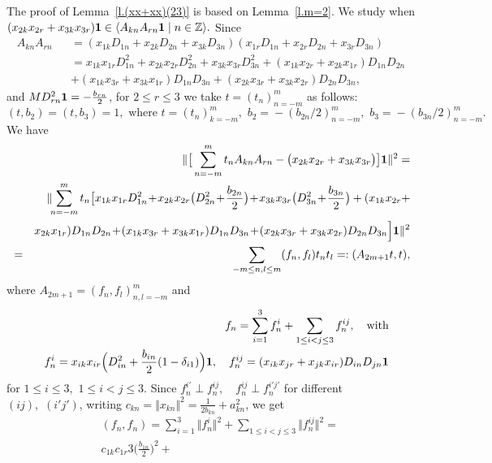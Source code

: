 \documentclass[preprint,12pt]{elsarticle}
\numberwithin{equation}{section}
\begin{document}
\begin{pf}The proof of  Lemma~\ref{l.(xx+xx)(23)}  is based on Lemma~\ref{l.m=2}. 
We study when
$
(x_{2k}x_{2r}+x_{3k}x_{3r}){\bf 1}
\in\langle A_{kn}A_{rn}{\bf 1}\mid n\in{\mathbb
Z}\rangle.
$
Since
\begin{eqnarray*}
A_{kn}A_{rn}&&=(x_{1k}D_{1n}+x_{2k}D_{2n}+x_{3k}D_{3n})(x_{1r}D_{1n}+x_{2r}D_{2n}+x_{3r}D_{3n})\\
&&=x_{1k}x_{1r}D_{1n}^2+
x_{2k}x_{2r}D_{2n}^2+
x_{3k}x_{3r}D_{3n}^2+
(x_{1k}x_{2r}+x_{2k}x_{1r})D_{1n}D_{2n}\\
&&
+(x_{1k}x_{3r}+x_{3k}x_{1r})D_{1n}D_{3n}+
(x_{2k}x_{3r}+x_{3k}x_{2r})D_{2n}D_{3n},
\end{eqnarray*}
and $MD_{rn}^2{\bf 1}=-\frac{b_{rn}}{2}$, for $2\leq r\leq 3$ we take $t=(t_n)_{n=-m}^m$ as follows:
$$
(t,b_2)\!=\!(t,b_3)\!=\!1,\,\,
\text{where} \,\, t\!=\!(t_n)_{k=-m}^m,\,\, 
b_2\!=\!-(b_{2n}/2)_{n=-m}^m,\,\, 
b_3\!=\!-(b_{3n}/2)_{n=-m}^m.
$$ 
We have
\begin{eqnarray*}
&&\Vert \big[\sum_{n=-m}^mt_nA_{kn}A_{rn}-\big(x_{2k}x_{2r}+x_{3k}x_{3r}\big)\big]{\bf
1}\Vert^2=\\
&&\Vert \!\!\sum_{n=-m}^mt_n\big[
x_{1k}x_{1r}D_{1n}^2\!+\!
x_{2k}x_{2r}
\big(D_{2n}^2\!+\!\frac{b_{2n}}{2}\big)\!+\!
x_{3k}x_{3r}\big(D_{3n}^2\!+\!\frac{b_{3n}}{2}\big)+(x_{1k}x_{2r}+\\
&&
x_{2k}x_{1r})
D_{1n}D_{2n}\!+\!(x_{1k}x_{3r}+x_{3k}x_{1r})D_{1n}D_{3n}\!+
\!(x_{2k}x_{3r}+x_{3k}x_{2r})D_{2n}D_{3n}
\Big]{\bf 1}\Vert^2\\
&=&\sum_{-m\leq n,l\leq m}(f_n,f_l)t_nt_l=:(A_{2m+1}t,t),
\end{eqnarray*}
%
where $A_{2m+1}=(f_n,f_l)_{n,l=-m}^m$ and
%
\begin{eqnarray}
\label{f_n(r),f_n(ij)}
&&
 f_n= \sum_{i=1}^3f_n^i
 +\sum_{1\leq i<j\leq 3}f_n^{ij},\quad\text{with}\\
 \nonumber
 &&
f_n^i= x_{ik}x_{ir}\Big(D_{in}^2+\frac{b_{in}}{2}(1-\delta_{i1})
\Big){\bf 1},
\quad
f_n^{ij}=(x_{ik}x_{jr}+x_{jk}x_{ir})D_{in}D_{jn}{\bf 1} 
\end{eqnarray}
for $1\leq i\leq 3,\,\, 1\leq i<j\leq 3$.
Since 
$
 f_n^{i'}\perp f_n^{ij},\quad f_n^{ij}\perp f_n^{i'j'}
$ 
for different  $(ij),\,\,(i'j')$,
writing $c_{kn}=\Vert x_{kn}\Vert^2=\frac{1}{2b_{kn}}+a_{kn}^2$,  we get
\begin{eqnarray*}
&&(f_n,f_n)=
\sum_{i=1}^3\Vert f_n^i\Vert^2
+\sum_{1\leq i<j\leq 3}\Vert f_n^{ij}\Vert^2=
\\ 
&&c_{1k}c_{1r}3\Big(\frac{b_{1n}}{2}\Big)^2+

\end{eqnarray*}
\end{pf}
\end{document}
